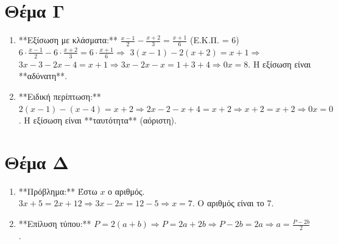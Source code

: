 \documentclass[11pt,a4paper,modern]{FFExercises}
\begin{document}
\section*{Θέμα Γ}
\begin{enumerate}
    \item **Εξίσωση με κλάσματα:**
    $\frac{x - 1}{2} - \frac{x + 2}{3} = \frac{x + 1}{6}$ (Ε.Κ.Π. = 6)
    $6 \cdot \frac{x - 1}{2} - 6 \cdot \frac{x + 2}{3} = 6 \cdot \frac{x + 1}{6} \Rightarrow$
    $3(x - 1) - 2(x + 2) = x + 1 \Rightarrow$
    $3x - 3 - 2x - 4 = x + 1 \Rightarrow 3x - 2x - x = 1 + 3 + 4 \Rightarrow 0x = 8$.
    Η εξίσωση είναι **αδύνατη**.
    \item **Ειδική περίπτωση:**
    $2(x - 1) - (x - 4) = x + 2 \Rightarrow 2x - 2 - x + 4 = x + 2 \Rightarrow x + 2 = x + 2 \Rightarrow 0x = 0$.
    Η εξίσωση είναι **ταυτότητα** (αόριστη).
\end{enumerate}

\section*{Θέμα Δ}
\begin{enumerate}
    \item **Πρόβλημα:** Έστω $x$ ο αριθμός.
    $3x + 5 = 2x + 12 \Rightarrow 3x - 2x = 12 - 5 \Rightarrow x = 7$.
    Ο αριθμός είναι το 7.
    \item **Επίλυση τύπου:** $P = 2(a + b) \Rightarrow P = 2a + 2b \Rightarrow P - 2b = 2a \Rightarrow a = \frac{P - 2b}{2}$.
\end{enumerate}
\end{document}
